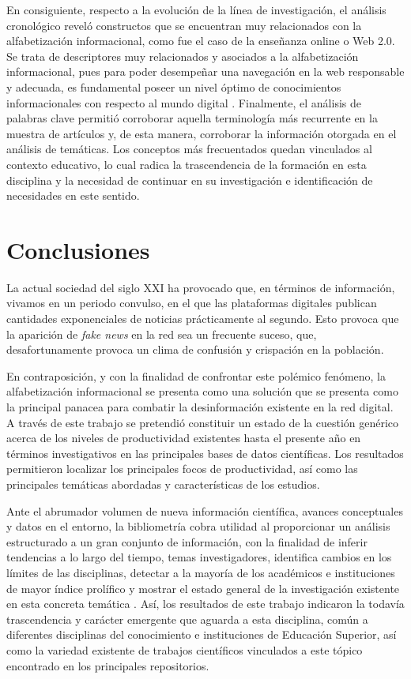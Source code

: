 \documentclass{textolivre}
\begin{document}
En consiguiente, respecto a la evolución de la línea de investigación, el análisis cronológico reveló constructos que se encuentran muy relacionados con la alfabetización informacional, como fue el caso de la enseñanza online o Web 2.0. Se trata de descriptores muy relacionados y asociados a la alfabetización informacional, pues para poder desempeñar una navegación en la web responsable y adecuada, es fundamental poseer un nivel óptimo de conocimientos informacionales con respecto al mundo digital \cite{oecd2017}. %
Finalmente, el análisis de palabras clave permitió corroborar aquella terminología más recurrente en la muestra de artículos y, de esta manera, corroborar la información otorgada en el análisis de temáticas. Los conceptos más frecuentados quedan vinculados al contexto educativo, lo cual radica la trascendencia de la formación en esta disciplina y la necesidad de continuar en su investigación e identificación de necesidades en este sentido.

\section{Conclusiones}
La actual sociedad del siglo XXI ha provocado que, en términos de información, vivamos en un periodo convulso, en el que las plataformas digitales publican cantidades exponenciales de noticias prácticamente al segundo. Esto provoca que la aparición de \emph{fake news} en la red sea un frecuente suceso, que, desafortunamente provoca un clima de confusión y crispación en la población.

En contraposición, y con la finalidad de confrontar este polémico fenómeno, la alfabetización informacional se presenta como una solución que se presenta como la principal panacea para combatir la desinformación existente en la red digital. A través de este trabajo se pretendió constituir un estado de la cuestión genérico acerca de los niveles de productividad existentes hasta el presente año en términos investigativos en las principales bases de datos científicas. Los resultados permitieron localizar los principales focos de productividad, así como las principales temáticas abordadas y características de los estudios.

Ante el abrumador volumen de nueva información científica, avances conceptuales y datos en el entorno, la bibliometría cobra utilidad al proporcionar un análisis estructurado a un gran conjunto de información, con la finalidad de inferir tendencias a lo largo del tiempo, temas investigadores, identifica cambios en los límites de las disciplinas, detectar a la mayoría de los académicos e instituciones de mayor índice prolífico y mostrar el estado general de la investigación existente en esta concreta temática \cite{aria2017}. %
Así, los resultados de este trabajo indicaron la todavía trascendencia y carácter emergente que aguarda a esta disciplina, común a diferentes disciplinas del conocimiento e instituciones de Educación Superior, así como la variedad existente de trabajos científicos vinculados a este tópico encontrado en los principales repositorios.
\end{document}
